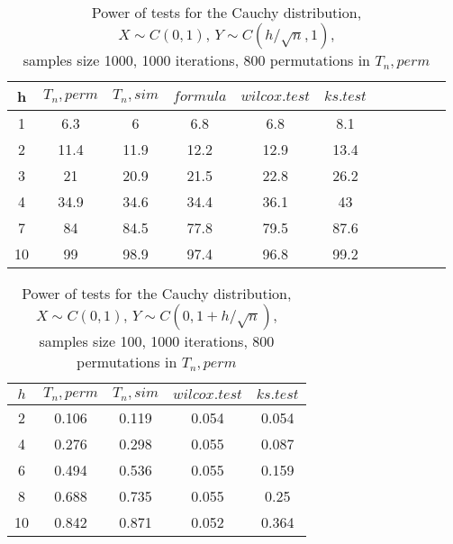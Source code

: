 \documentclass[slidestop,usepdftitle=false]{beamer}
\begin{document}
\begin{slide}
\begin{longtable}{|c|c|c|c|c|c|c|c|c|c|c|}
  \caption{Power of tests for the Cauchy distribution, \\
           $X\sim C(0,1)$, $Y\sim C(h/\sqrt{n},1)$, \\
           samples size 1000, 1000 iterations, 800 permutations in $T_n, perm$} \\
  \hline
  h  & $T_n, perm$ & $T_n, sim$ & $formula$ & $wilcox.test$ & $ks.test$ \\ \hline
  1  & 6.3   & 6        & 6.8       & 6.8           & 8.1       \\
  2  & 11.4  & 11.9     & 12.2      & 12.9          & 13.4      \\
  3  & 21    & 20.9     & 21.5      & 22.8          & 26.2      \\
  4  & 34.9  & 34.6     & 34.4      & 36.1          & 43        \\
  7  & 84    & 84.5     & 77.8      & 79.5          & 87.6      \\
  10 & 99    & 98.9     & 97.4      & 96.8          & 99.2      \\ \hline
\end{longtable}
\end{slide}

\begin{slide}
\begin{longtable}{|c|c|c|c|c|}
  \caption{Power of tests for the Cauchy distribution, \\
           $X\sim C(0,1)$, $Y\sim C(0, 1 + h/\sqrt{n})$, \\
           samples size 100, 1000 iterations, 800 permutations in $T_n, perm$} \\
  \hline
  $h$ & $T_n, perm$ & $T_n, sim$ & $wilcox.test$ & $ks.test$ \\
  \hline
  2 & 0.106 & 0.119 & 0.054 & 0.054 \\
  4 & 0.276 & 0.298 & 0.055 & 0.087 \\
  6 & 0.494 & 0.536 & 0.055 & 0.159 \\
  8 & 0.688 & 0.735 & 0.055 & 0.25 \\
  10 & 0.842 & 0.871 & 0.052 & 0.364 \\
  \hline
\end{longtable}
\end{slide}
\end{document}
